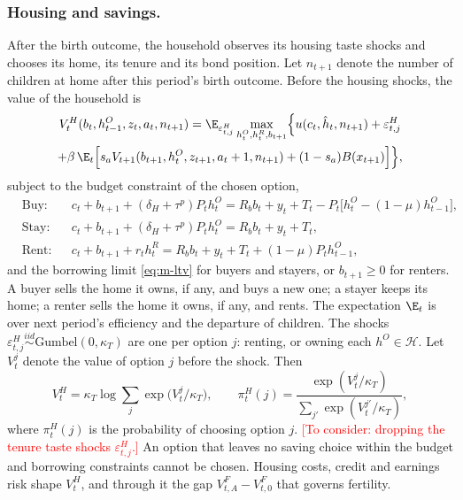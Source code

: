 \subsubsection*{Housing and savings.}
After the birth outcome, the household observes its housing taste shocks and
chooses its home, its tenure and its bond position. Let $n_{t+1}$ denote the
number of children at home after this period's birth outcome. Before the
housing shocks, the value of the household is
\begin{multline}
 V^H_t(b_t,h^O_{t-1},z_t,a_t,n_{t+1})
 =\E_{\varepsilon^H_{t,j}}\max_{h^O_t,h^R_t,b_{t+1}}
 \Bigl\{u(c_t,\hat h_t,n_{t+1})+\varepsilon^H_{t,j}\\
 +\beta\,\E_t\Bigl[s_aV_{t+1}(b_{t+1},h^O_t,z_{t+1},a_t+1,n_{t+1})
 +(1-s_a)B(x_{t+1})\Bigr]\Bigr\},
 \label{eq:m-vh}
\end{multline}
subject to the budget constraint of the chosen option,
\begin{equation}
\begin{aligned}
 &\text{Buy:}  && c_t+b_{t+1}+(\delta_H+\tau^p)P_th^O_t=R_bb_t+y_t+T_t-P_t\bigl[h^O_t-(1-\mu)h^O_{t-1}\bigr],\\
 &\text{Stay:} && c_t+b_{t+1}+(\delta_H+\tau^p)P_th^O_t=R_bb_t+y_t+T_t,\\
 &\text{Rent:} && c_t+b_{t+1}+r_th^R_t=R_bb_t+y_t+T_t+(1-\mu)P_th^O_{t-1},
\end{aligned}
 \label{eq:m-budget}
\end{equation}
and the borrowing limit \eqref{eq:m-ltv} for buyers and stayers, or
$b_{t+1}\ge0$ for renters. A buyer sells the home it owns, if any, and buys a
new one; a stayer keeps its home; a renter sells the home it owns, if any, and
rents. The expectation $\E_t$ is over next period's efficiency and the
departure of children. The shocks
$\varepsilon^H_{t,j}\overset{iid}{\sim}\text{Gumbel}(0,\kappa_T)$ are one per
option $j$: renting, or owning each $h^O\in\mathcal H$. Let $V^j_t$ denote the
value of option $j$ before the shock. Then
\begin{equation}
 V^H_t=\kappa_T\log\sum_{j}\exp\bigl(V^j_t/\kappa_T\bigr),
 \qquad
 \pi^H_t(j)=\frac{\exp(V^j_t/\kappa_T)}{\sum_{j'}\exp(V^{j'}_t/\kappa_T)},
 \label{eq:m-tenure}
\end{equation}
where $\pi^H_t(j)$ is the probability of choosing option $j$. \textcolor{red}{[To consider: dropping the
tenure taste shocks $\varepsilon^H_{t,j}$.]} An option that
leaves no saving choice within the budget and borrowing constraints cannot be
chosen. Housing costs, credit and earnings risk shape $V^H_t$, and through it
the gap $V^F_{t,A}-V^F_{t,0}$ that governs fertility.

